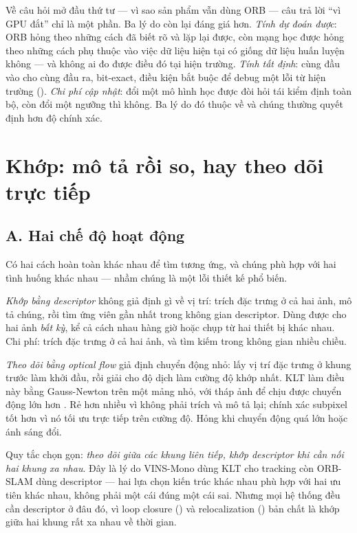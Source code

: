 \documentclass[../../vslam.tex]{subfiles}
\begin{document}
Về câu hỏi mở đầu thứ tư --- vì sao sản phẩm vẫn dùng ORB --- câu trả lời ``vì GPU đắt'' chỉ là một phần. Ba lý do còn lại đáng giá hơn. \emph{Tính dự đoán được}: ORB hỏng theo những cách đã biết rõ và lặp lại được, còn mạng học được hỏng theo những cách phụ thuộc vào việc dữ liệu hiện tại có giống dữ liệu huấn luyện không --- và không ai đo được điều đó tại hiện trường. \emph{Tính tất định}: cùng đầu vào cho cùng đầu ra, bit-exact, điều kiện bắt buộc để debug một lỗi từ hiện trường (). \emph{Chi phí cập nhật}: đổi một mô hình học được đòi hỏi tái kiểm định toàn bộ, còn đổi một ngưỡng thì không. Ba lý do đó thuộc về  và chúng thường quyết định hơn độ chính xác.

\section{Khớp: mô tả rồi so, hay theo dõi trực tiếp}

\subsection{A. Hai chế độ hoạt động}

Có hai cách hoàn toàn khác nhau để tìm tương ứng, và chúng phù hợp với hai tình huống khác nhau --- nhầm chúng là một lỗi thiết kế phổ biến.

\emph{Khớp bằng descriptor} không giả định gì về vị trí: trích đặc trưng ở cả hai ảnh, mô tả chúng, rồi tìm ứng viên gần nhất trong không gian descriptor. Dùng được cho hai ảnh \emph{bất kỳ}, kể cả cách nhau hàng giờ hoặc chụp từ hai thiết bị khác nhau. Chi phí: trích đặc trưng ở cả hai ảnh, và tìm kiếm trong không gian nhiều chiều.

\emph{Theo dõi bằng optical flow} giả định chuyển động nhỏ: lấy vị trí đặc trưng ở khung trước làm khởi đầu, rồi giải cho độ dịch làm cường độ khớp nhất. KLT làm điều này bằng Gauss-Newton trên một mảng nhỏ, với tháp ảnh để chịu được chuyển động lớn hơn \cite{bouguet2001klt}. Rẻ hơn nhiều vì không phải trích và mô tả lại; chính xác subpixel tốt hơn vì nó tối ưu trực tiếp trên cường độ. Hỏng khi chuyển động quá lớn hoặc ánh sáng đổi.

Quy tắc chọn gọn: \emph{theo dõi giữa các khung liên tiếp, khớp descriptor khi cần nối hai khung xa nhau}. Đây là lý do VINS-Mono dùng KLT cho tracking \cite{qin2018vinsmono} còn ORB-SLAM dùng descriptor --- hai lựa chọn kiến trúc khác nhau phù hợp với hai ưu tiên khác nhau, không phải một cái đúng một cái sai. Nhưng mọi hệ thống đều cần descriptor ở đâu đó, vì loop closure () và relocalization () bản chất là khớp giữa hai khung rất xa nhau về thời gian.
\end{document}
